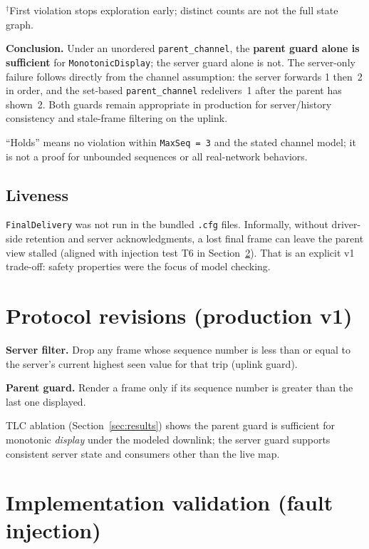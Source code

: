 \documentclass[11pt,a4paper]{article}
\begin{document}
\noindent$^\dagger$First violation stops exploration early; distinct counts are not the full state graph.

\textbf{Conclusion.} Under an unordered \texttt{parent\_channel}, the \textbf{parent guard alone is sufficient} for \texttt{MonotonicDisplay}; the server guard alone is not. The server-only failure follows directly from the channel assumption: the server forwards 1 then~2 in order, and the set-based \texttt{parent\_channel} redelivers~1 after the parent has shown~2. Both guards remain appropriate in production for server/history consistency and stale-frame filtering on the uplink.

``Holds'' means no violation within \texttt{MaxSeq = 3} and the stated channel model; it is not a proof for unbounded sequences or all real-network behaviors.

\subsection{Liveness}

\texttt{FinalDelivery} was not run in the bundled \texttt{.cfg} files. Informally, without driver-side retention and server acknowledgments, a lost final frame can leave the parent view stalled (aligned with injection test T6 in Section~\ref{sec:injection}). That is an explicit v1 trade-off: safety properties were the focus of model checking.

\section{Protocol revisions (production v1)}
\label{sec:fixes}

\textbf{Server filter.} Drop any frame whose sequence number is less than or equal to the server's current highest seen value for that trip (uplink guard).

\textbf{Parent guard.} Render a frame only if its sequence number is greater than the last one displayed.

TLC ablation (Section~\ref{sec:results}) shows the parent guard is sufficient for monotonic \emph{display} under the modeled downlink; the server guard supports consistent server state and consumers other than the live map.

\section{Implementation validation (fault injection)}
\label{sec:injection}
\end{document}
